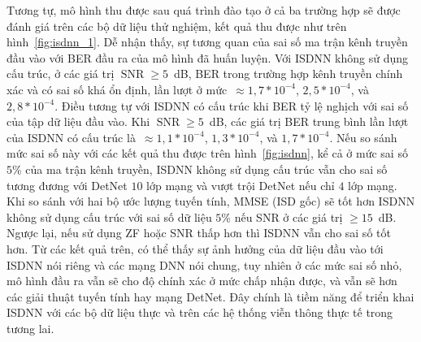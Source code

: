 Tương tự, mô hình thu được sau quá trình đào tạo ở cả ba trường hợp sẽ được đánh giá trên các bộ dữ liệu thử nghiệm, kết quả thu được như trên hình~\ref{fig:isdnn_1}. Dễ nhận thấy, sự tương quan của sai số ma trận kênh truyền đầu vào với BER đầu ra của mô hình đã huấn luyện. Với ISDNN không sử dụng cấu trúc, ở các giá trị $\operatorname{SNR}\ge 5$~dB, BER trong trường hợp kênh truyền chính xác và có sai số khá ổn định, lần lượt ở mức~$\approx 1,7 * 10^{-4}$, $2,5* 10^{-4}$, và $2,8* 10^{-4}$. 
Điều tương tự với ISDNN có cấu trúc khi BER tỷ lệ nghịch với sai số của tập dữ liệu đầu vào. Khi $\operatorname{SNR}\ge 5$~dB, các giá trị BER trung bình lần lượt của ISDNN có cấu trúc là~$\approx 1,1 * 10^{-4}$, $1,3* 10^{-4}$, và $1,7* 10^{-4}$. 
Nếu so sánh mức sai số này với các kết quả thu được trên hình~\ref{fig:isdnn}, kể cả ở mức sai số $5$\% của ma trận kênh truyền, ISDNN không sử dụng cấu trúc vẫn cho sai số tương đương với DetNet $10$ lớp mạng và vượt trội DetNet nếu chỉ $4$ lớp mạng. Khi so sánh với hai bộ ước lượng tuyến tính, MMSE (ISD gốc) sẽ tốt hơn ISDNN không sử dụng cấu trúc với sai số dữ liệu $5$\% nếu SNR ở các giá trị $\ge 15$~dB. Ngược lại, nếu sử dụng ZF hoặc SNR thấp hơn thì ISDNN vẫn cho sai số tốt hơn. Từ các kết quả trên, có thể thấy sự ảnh hưởng của dữ liệu đầu vào tới ISDNN nói riêng và các mạng DNN nói chung, tuy nhiên ở các mức sai số nhỏ, mô hình đầu ra vẫn sẽ cho độ chính xác ở mức chấp nhận được, và vẫn sẽ hơn các giải thuật tuyến tính hay mạng DetNet. Đây chính là tiềm năng để triển khai ISDNN với các bộ dữ liệu thực và trên các hệ thống viễn thông thực tế trong tương lai.

